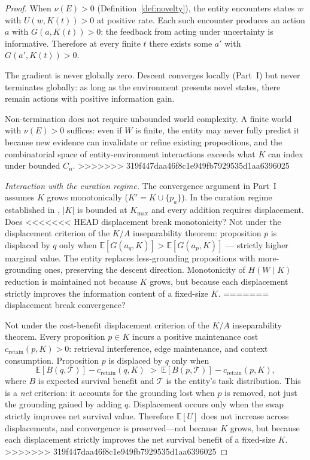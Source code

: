 \documentclass[11pt]{article}
\theoremstyle{definition}
\begin{document}
\begin{proof}
When $\nu(E) > 0$ (Definition~\ref{def:novelty}), the entity
encounters states $w$ with $U(w, K(t)) > 0$ at positive rate. Each
such encounter produces an action $a$ with $G(a, K(t)) > 0$: the
feedback from acting under uncertainty is informative. Therefore at
every finite $t$ there exists some $a'$ with $G(a', K(t)) > 0$.

The gradient is never globally zero. Descent converges locally
(Part~I) but never terminates globally: as long as the environment
presents novel states, there remain actions with positive information
gain.

Non-termination does not require unbounded world complexity. A finite
world with $\nu(E) > 0$ suffices: even if $W$ is finite, the entity
may never fully predict it because new evidence can invalidate or
refine existing propositions, and the combinatorial space of
entity-environment interactions exceeds what $K$ can index under
bounded $C_n$.
>>>>>>> 319f447daa46f8c1e949fb7929535d1aa6396025

\emph{Interaction with the curation regime.} The convergence argument
in Part~I assumes $K$ grows monotonically ($K' = K \cup \{p_a\}$). In
the curation regime established in \cite{McCarthy2026c}, $|K|$ is
bounded at $K_{\max}$ and every addition requires displacement. Does
<<<<<<< HEAD
displacement break monotonicity? Not under the displacement criterion
of the $K/A$ inseparability theorem: proposition $p$ is displaced by
$q$ only when $\mathbb{E}[G(a_q, K)] > \mathbb{E}[G(a_p, K)]$ ---
strictly higher marginal value. The entity replaces less-grounding
propositions with more-grounding ones, preserving the descent
direction. Monotonicity of $H(W \mid K)$ reduction is maintained not
because $K$ grows, but because each displacement strictly improves the
information content of a fixed-size $K$.
=======
displacement break convergence?

Not under the cost-benefit displacement criterion of the $K/A$
inseparability theorem. Every proposition $p \in K$ incurs a positive
maintenance cost $c_{\text{retain}}(p, K) > 0$: retrieval interference,
edge maintenance, and context consumption. Proposition $p$ is displaced
by $q$ only when
\[
  \mathbb{E}[B(q, \mathcal{T})] - c_{\text{retain}}(q, K)
  \;>\;
  \mathbb{E}[B(p, \mathcal{T})] - c_{\text{retain}}(p, K),
\]
where $B$ is expected survival benefit and $\mathcal{T}$ is the
entity's task distribution. This is a \emph{net} criterion: it accounts
for the grounding lost when $p$ is removed, not just the grounding
gained by adding $q$. Displacement occurs only when the swap strictly
improves net survival value. Therefore $\mathbb{E}[U]$ does not
increase across displacements, and convergence is preserved---not
because $K$ grows, but because each displacement strictly improves the
net survival benefit of a fixed-size $K$.
>>>>>>> 319f447daa46f8c1e949fb7929535d1aa6396025


\end{proof}
\end{document}
